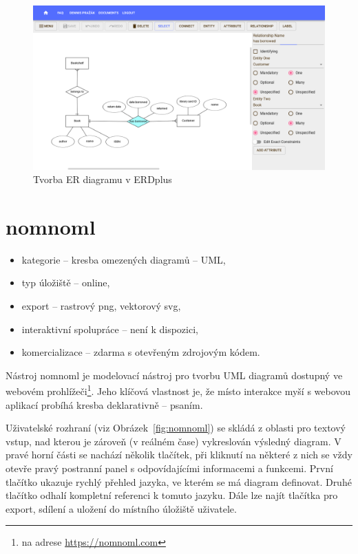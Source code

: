\begin{figure}[!htb]
  \centering
  \includegraphics[width = \maxwidth{\textwidth}]{../img/erdplus.png}
  \caption{Tvorba ER diagramu v ERDplus}
  \label{fig:erdplus}
\end{figure}

\section{nomnoml}

\begin{itemize}
  \item kategorie -- kresba omezených diagramů -- UML,
  \item typ úložiště -- online,
  \item export -- rastrový \acrshort{png}, vektorový \acrshort{svg},
  \item interaktivní spolupráce -- není k dispozici,
  \item komercializace -- zdarma s otevřeným zdrojovým kódem.
\end{itemize}

Nástroj nomnoml je modelovací nástroj pro tvorbu UML diagramů dostupný ve webovém prohlížeči\footnote{na adrese \url{https://nomnoml.com}}.
Jeho klíčová vlastnost je, že místo interakce myší s webovou aplikací probíhá kresba deklarativně -- psaním.

Uživatelské rozhraní (viz Obrázek~\ref{fig:nomnoml}) se skládá z oblasti pro textový vstup, nad kterou je zároveň (v reálném čase) vykreslován výsledný diagram.
V pravé horní části se nachází několik tlačítek, při kliknutí na některé z nich se vždy otevře pravý postranní panel s odpovídajícími informacemi a funkcemi.
První tlačítko ukazuje rychlý přehled jazyka, ve kterém se má diagram definovat.
Druhé tlačítko odhalí kompletní referenci k tomuto jazyku.
Dále lze najít tlačítka pro export, sdílení a uložení do místního úložiště uživatele.

